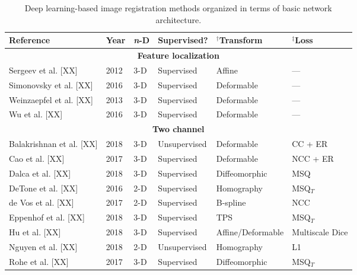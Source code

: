 

\begin{table}[!htb]
\centering
\caption{Deep learning-based image registration methods organized in terms of basic
         network architecture.}
\label{table:methods}
\begin{tabular*}{\textwidth}{l@{\extracolsep{\fill}}l@{\extracolsep{\fill}}l@{\extracolsep{\fill}}l@{\extracolsep{\fill}}l@{\extracolsep{\fill}}l}
\toprule
\midrule
\textbf{Reference} & \textbf{Year} & \textbf{\textit{n}-D} & \textbf{Supervised?} & $^\dagger$\textbf{Transform} & $^\ddagger$\textbf{Loss} \\
\midrule
\midrule
\multicolumn{6}{c}{\textbf{Feature localization}}
  \vspace{0.25cm} \\
  Sergeev et al. [XX] & 2012 & 3-D & Supervised & Affine & --- \\
  Simonovsky et al. [XX] & 2016 & 3-D & Supervised & Deformable & --- \\
  Weinzaepfel et al. [XX] & 2013 & 3-D & Supervised & Deformable & --- \\
  Wu et al. [XX] & 2016 & 3-D & Supervised & Deformable & --- \\
\midrule
\multicolumn{6}{c}{\textbf{Two channel}}
  \vspace{0.25cm} \\
  Balakrishnan et al. [XX] & 2018 & 3-D & Unsupervised & Deformable & CC + ER \\
  Cao et al. [XX] & 2017 & 3-D & Supervised & Deformable & NCC + ER \\
  Dalca et al. [XX] & 2018 & 3-D & Supervised & Diffeomorphic & MSQ \\
  DeTone et al. [XX] & 2016 & 2-D & Supervised & Homography & MSQ$_T$ \\ %
  de Vos et al. [XX] & 2017 & 2-D & Supervised & B-spline & NCC \\
  Eppenhof et al. [XX] & 2018 & 3-D & Supervised & TPS & MSQ$_T$ \\       %
  Hu et al. [XX] & 2018 & 3-D & Supervised & Affine/Deformable & Multiscale Dice \\
  Nguyen et al. [XX] & 2018 & 2-D & Unsupervised & Homography & L1 \\
  Rohe et al. [XX] & 2017 & 3-D & Supervised & Diffeomorphic & MSQ$_T$ \\  %

\end{tabular*}
\end{table}
